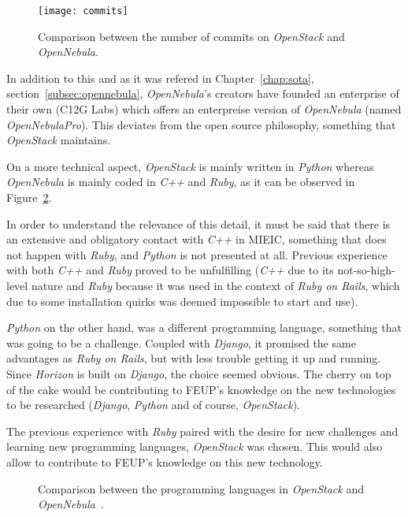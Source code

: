 \begin{figure}[h]
  \begin{center}
    \leavevmode
    \texttt{[image: commits]}
    \caption{Comparison between the number of commits on \textit{OpenStack} and \textit{OpenNebula}.~\cite{ohloh}}
    \label{fig:commits}
  \end{center}
\end{figure}

In addition to this and as it was refered in Chapter~\ref{chap:sota}, section~\ref{subsec:opennebula}, \textit{OpenNebula}'s creators have founded an enterprise of their own (C12G Labs) which offers an enterpreise version of \textit{OpenNebula} (named \textit{OpenNebulaPro}). This deviates from the open source philosophy, something that \textit{OpenStack} maintains.

On a more technical aspect, \textit{OpenStack} is mainly written in \textit{Python} whereas \textit{OpenNebula} is mainly coded in \textit{C++} and \textit{Ruby}, as it can be observed in Figure~\ref{fig:code-stack-nebula}. 

In order to understand the relevance of this detail, it must be said that there is an extensive and obligatory contact with \textit{C++} in MIEIC, something that does not happen with \textit{Ruby}, and \textit{Python} is not presented at all. Previous experience with both \textit{C++} and \textit{Ruby} proved to be unfulfilling (\textit{C++} due to its not-so-high-level nature and \textit{Ruby} because it was used in the context of \textit{Ruby on Rails}, which due to some installation quirks was deemed impossible to start and use). 

\textit{Python} on the other hand, was a different programming language, something that was going to be a challenge. Coupled with \textit{Django}, it promised the same advantages as \textit{Ruby on Rails}, but with less trouble getting it up and running. Since \textit{Horizon} is built on \textit{Django}, the choice seemed obvious. The cherry on top of the cake would be contributing to FEUP's knowledge on the new technologies to be researched (\textit{Django}, \textit{Python} and of course, \textit{OpenStack}).

The previous experience with \textit{Ruby} paired with the desire for new challenges and learning new programming languages, \textit{OpenStack} was chosen. This would also allow to contribute to FEUP's knowledge on this new technology.

\begin{figure}[h!]
  \begin{center}
    \leavevmode
    \caption{Comparison between the programming languages in \textit{OpenStack} and \textit{OpenNebula}~\cite{ohloh}.}
    \label{fig:code-stack-nebula}
  \end{center}
\end{figure}

